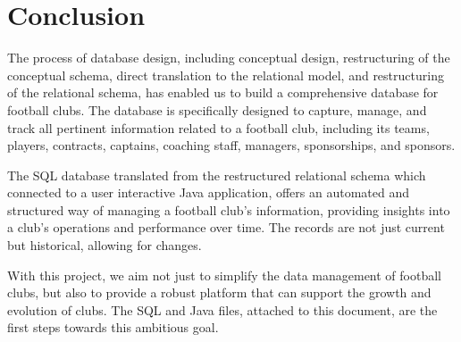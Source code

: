 
\section{Conclusion}

The process of database design, including conceptual design, restructuring of the conceptual schema, direct translation to the relational model, and restructuring of the relational schema, has enabled us to build a comprehensive database for football clubs. The database is specifically designed to capture, manage, and track all pertinent information related to a football club, including its teams, players, contracts, captains, coaching staff, managers, sponsorships, and sponsors.
\newline


The SQL database translated from the restructured relational schema which connected to a user interactive Java application, offers an automated and structured way of managing a football club's information, providing insights into a club’s operations and performance over time. The records are not just current but historical, allowing for changes.
\newline


With this project, we aim not just to simplify the data management of football clubs, but also to provide a robust platform that can support the growth and evolution of clubs. The SQL and Java files, attached to this document, are the first steps towards this ambitious goal.